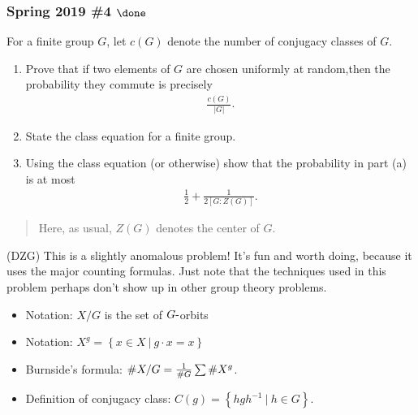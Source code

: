 \hypertarget{spring-2019-4-done}{%
\subsubsection{\texorpdfstring{Spring 2019 \#4
\(\done\)}{Spring 2019 \#4 \textbackslash done}}\label{spring-2019-4-done}}

For a finite group \(G\), let \(c(G)\) denote the number of conjugacy
classes of \(G\).

\begin{enumerate}
\def\labelenumi{\alph{enumi}.}
\item
  Prove that if two elements of \(G\) are chosen uniformly at
  random,then the probability they commute is precisely
  \begin{align*}
  \frac{c(G)}{{\left\lvert {G} \right\rvert}}
  .\end{align*}
\item
  State the class equation for a finite group.
\item
  Using the class equation (or otherwise) show that the probability in
  part (a) is at most
  \begin{align*}
  \frac 1 2 + \frac 1 {2[G : Z(G)]}
  .\end{align*}
\end{enumerate}

\begin{quote}
Here, as usual, \(Z(G)\) denotes the center of \(G\).
\end{quote}

\begin{warnings}

(DZG) This is a slightly anomalous problem! It's fun and worth doing,
because it uses the major counting formulas. Just note that the
techniques used in this problem perhaps don't show up in other group
theory problems.

\end{warnings}

\begin{concept}

\envlist

\begin{itemize}
\tightlist
\item
  Notation: \(X/G\) is the set of \(G{\hbox{-}}\)orbits
\item
  Notation:
  \(X^g = \left\{{x\in X{~\mathrel{\Big|}~}g\cdot x = x}\right\}\)
\item
  Burnside's formula: \(\#{X/G} = {1 \over \# G} \sum \# {X^g}\).
\item
  Definition of conjugacy class:
  \(C(g) = \left\{{ hgh^{-1}{~\mathrel{\Big|}~}h\in G }\right\}\).
\end{itemize}

\end{concept}

